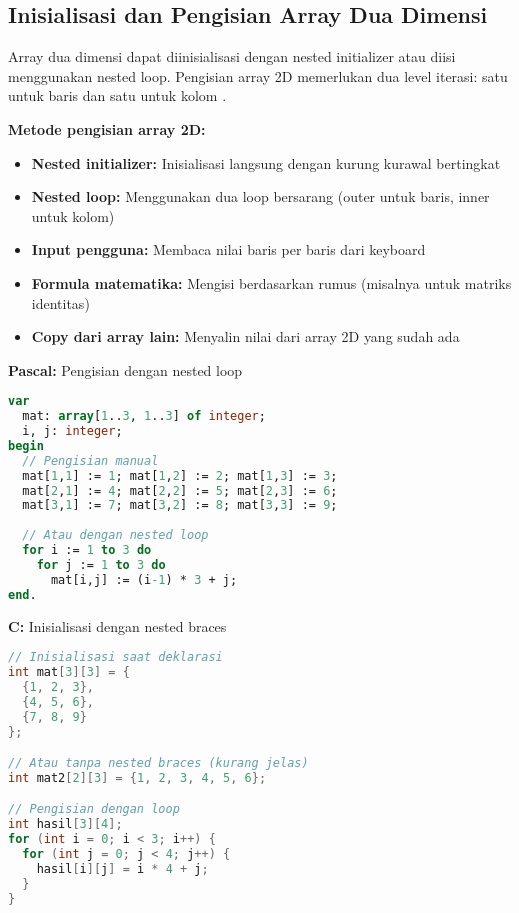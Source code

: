 \documentclass[../main.tex]{subfiles}
\begin{document}
\subsection{Inisialisasi dan Pengisian Array Dua Dimensi}

Array dua dimensi dapat diinisialisasi dengan nested initializer atau diisi menggunakan nested loop. Pengisian array 2D memerlukan dua level iterasi: satu untuk baris dan satu untuk kolom \parencite{geeksforgeeks-2d-array,learncpp-multidimensional,duniailkom-cpp-2d-array}.

\textbf{Metode pengisian array 2D:}
\begin{itemize}
  \item \textbf{Nested initializer:} Inisialisasi langsung dengan kurung kurawal bertingkat
  \item \textbf{Nested loop:} Menggunakan dua loop bersarang (outer untuk baris, inner untuk kolom)
  \item \textbf{Input pengguna:} Membaca nilai baris per baris dari keyboard
  \item \textbf{Formula matematika:} Mengisi berdasarkan rumus (misalnya untuk matriks identitas)
  \item \textbf{Copy dari array lain:} Menyalin nilai dari array 2D yang sudah ada
\end{itemize}

\textbf{Pascal:} Pengisian dengan nested loop
\begin{lstlisting}[language=Pascal, caption={Inisialisasi array 2D di Pascal}]
var
  mat: array[1..3, 1..3] of integer;
  i, j: integer;
begin
  // Pengisian manual
  mat[1,1] := 1; mat[1,2] := 2; mat[1,3] := 3;
  mat[2,1] := 4; mat[2,2] := 5; mat[2,3] := 6;
  mat[3,1] := 7; mat[3,2] := 8; mat[3,3] := 9;
  
  // Atau dengan nested loop
  for i := 1 to 3 do
    for j := 1 to 3 do
      mat[i,j] := (i-1) * 3 + j;
end.
\end{lstlisting}

\textbf{C:} Inisialisasi dengan nested braces
\begin{lstlisting}[language=C, caption={Inisialisasi array 2D di C}]
// Inisialisasi saat deklarasi
int mat[3][3] = {
  {1, 2, 3},
  {4, 5, 6},
  {7, 8, 9}
};

// Atau tanpa nested braces (kurang jelas)
int mat2[2][3] = {1, 2, 3, 4, 5, 6};

// Pengisian dengan loop
int hasil[3][4];
for (int i = 0; i < 3; i++) {
  for (int j = 0; j < 4; j++) {
    hasil[i][j] = i * 4 + j;
  }
}
\end{lstlisting}
\end{document}
